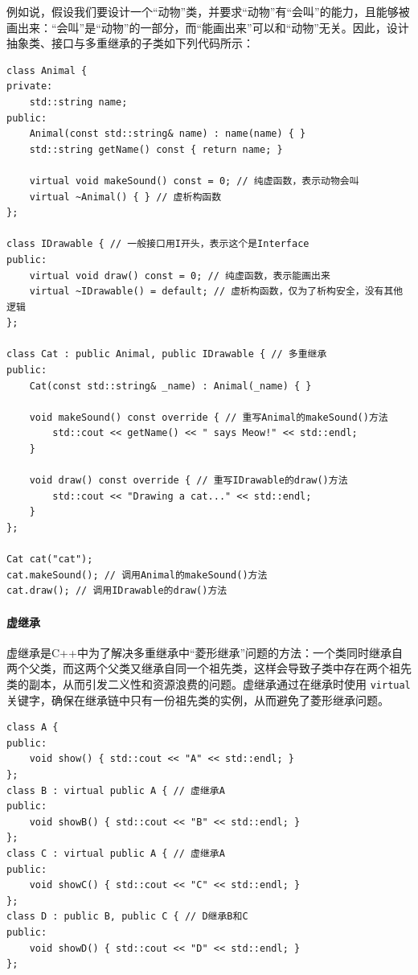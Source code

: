 例如说，假设我们要设计一个“动物”类，并要求“动物”有“会叫”的能力，且能够被画出来：“会叫”是“动物”的一部分，而“能画出来”可以和“动物”无关。因此，设计抽象类、接口与多重继承的子类如下列代码所示：
\begin{verbatim}
class Animal {
private:
    std::string name;
public:
    Animal(const std::string& name) : name(name) { }
    std::string getName() const { return name; }

    virtual void makeSound() const = 0; // 纯虚函数，表示动物会叫
    virtual ~Animal() { } // 虚析构函数
};

class IDrawable { // 一般接口用I开头，表示这个是Interface
public:
    virtual void draw() const = 0; // 纯虚函数，表示能画出来
    virtual ~IDrawable() = default; // 虚析构函数，仅为了析构安全，没有其他逻辑
};

class Cat : public Animal, public IDrawable { // 多重继承
public:
    Cat(const std::string& _name) : Animal(_name) { }

    void makeSound() const override { // 重写Animal的makeSound()方法
        std::cout << getName() << " says Meow!" << std::endl;
    }

    void draw() const override { // 重写IDrawable的draw()方法
        std::cout << "Drawing a cat..." << std::endl;
    }
};

Cat cat("cat");
cat.makeSound(); // 调用Animal的makeSound()方法
cat.draw(); // 调用IDrawable的draw()方法
\end{verbatim}

\paragraph{虚继承}

虚继承是C++中为了解决多重继承中“菱形继承”问题的方法：一个类同时继承自两个父类，而这两个父类又继承自同一个祖先类，这样会导致子类中存在两个祖先类的副本，从而引发二义性和资源浪费的问题。虚继承通过在继承时使用 \verb|virtual| 关键字，确保在继承链中只有一份祖先类的实例，从而避免了菱形继承问题。

\begin{verbatim}
class A {
public:
    void show() { std::cout << "A" << std::endl; }
};
class B : virtual public A { // 虚继承A
public:
    void showB() { std::cout << "B" << std::endl; }
};
class C : virtual public A { // 虚继承A
public:
    void showC() { std::cout << "C" << std::endl; }
};
class D : public B, public C { // D继承B和C
public:
    void showD() { std::cout << "D" << std::endl; }
};
\end{verbatim}

